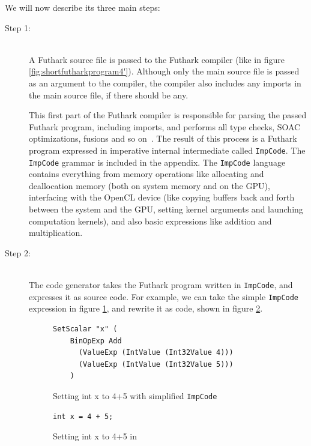 We will now describe its three main steps:
\begin{description}
\item[Step 1:]\hfill\\
  A Futhark source file is passed to the Futhark compiler (like in figure
  \ref{fig:shortfutharkprogram4'}). Although only the main source file is passed
  as an argument to the compiler, the compiler also includes any imports in the
  main source file, if there should be any.

  This first part of the Futhark compiler is responsible for parsing the passed
  Futhark program, including imports, and performs all type checks, SOAC
  optimizations, fusions and so on~\cite{pldi17}. The result of this process is a
  Futhark program expressed in imperative internal intermediate called \texttt{ImpCode}.
  The \texttt{ImpCode} grammar is included in the appendix. The \texttt{ImpCode}
  language contains everything from memory operations like allocating and
  deallocation memory (both on system memory and on the GPU), interfacing with
  the OpenCL device (like copying buffers back and forth between the system and
  the GPU, setting kernel arguments and launching computation kernels), and also
  basic expressions like addition and multiplication.

\item[Step 2:]\hfill\\
  The \csharp{} code generator takes the Futhark program written in
  \texttt{ImpCode}, and expresses it as \csharp{} source code.
  For example, we can take the simple \texttt{ImpCode} expression in figure \ref{fig:impcode},
  and rewrite it as \csharp{} code, shown in figure \ref{fig:impcodeascs}.
  \begin{figure}[H]
    \centering
\begin{verbatim}
SetScalar "x" (
    BinOpExp Add 
      (ValueExp (IntValue (Int32Value 4))) 
      (ValueExp (IntValue (Int32Value 5)))
    )
\end{verbatim}
    \caption{Setting int x to 4+5 with simplified \texttt{ImpCode}}
    \label{fig:impcode}
  \end{figure}

\begin{figure}[H]
\centering
\begin{verbatim}
int x = 4 + 5;
\end{verbatim}
\caption{Setting int x to 4+5 in \csharp{}}
\label{fig:impcodeascs}
  \end{figure}


\end{description}
